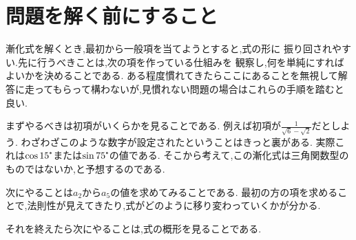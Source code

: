 
\section{問題を解く前にすること}

漸化式を解くとき,最初から一般項を当てようとすると,式の形に
振り回されやすい.先に行うべきことは,次の項を作っている仕組みを
観察し,何を単純にすればよいかを決めることである.
ある程度慣れてきたらここにあることを無視して解答に走ってもらって構わないが,見慣れない問題の場合はこれらの手順を踏むと良い.

まずやるべきは初項がいくらかを見ることである.
例えば初項が$\displaystyle \frac{1}{\sqrt{6}-\sqrt{2}}$だとしよう.
わざわざこのような数字が設定されたということはきっと裏がある.
実際これは$\cos 15 \tcdegree $または$\sin 75 \tcdegree $の値である.
そこから考えて,この漸化式は三角関数型のものではないか,と予想するのである.

次にやることは$a_2$から$a_5$の値を求めてみることである.
最初の方の項を求めることで,法則性が見えてきたり,式がどのように移り変わっていくかが分かる.

それを終えたら次にやることは,式の概形を見ることである.